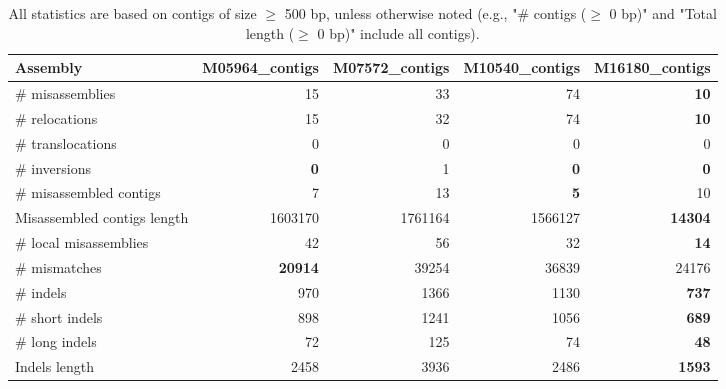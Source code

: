 \documentclass[12pt,a4paper]{article}
\begin{document}
\begin{table}[ht]
\begin{center}
\caption{All statistics are based on contigs of size $\geq$ 500 bp, unless otherwise noted (e.g., "\# contigs ($\geq$ 0 bp)" and "Total length ($\geq$ 0 bp)" include all contigs).}
\begin{tabular}{|l*{4}{|r}|}
\hline
Assembly & M05964\_contigs & M07572\_contigs & M10540\_contigs & M16180\_contigs \\ \hline
\# misassemblies & 15 & 33 & 74 & {\bf 10} \\ \hline
\hspace{5mm}\# relocations & 15 & 32 & 74 & {\bf 10} \\ \hline
\hspace{5mm}\# translocations & 0 & 0 & 0 & 0 \\ \hline
\hspace{5mm}\# inversions & {\bf 0} & 1 & {\bf 0} & {\bf 0} \\ \hline
\# misassembled contigs & 7 & 13 & {\bf 5} & 10 \\ \hline
Misassembled contigs length & 1603170 & 1761164 & 1566127 & {\bf 14304} \\ \hline
\# local misassemblies & 42 & 56 & 32 & {\bf 14} \\ \hline
\# mismatches & {\bf 20914} & 39254 & 36839 & 24176 \\ \hline
\# indels & 970 & 1366 & 1130 & {\bf 737} \\ \hline
\hspace{5mm}\# short indels & 898 & 1241 & 1056 & {\bf 689} \\ \hline
\hspace{5mm}\# long indels & 72 & 125 & 74 & {\bf 48} \\ \hline
Indels length & 2458 & 3936 & 2486 & {\bf 1593} \\ \hline
\end{tabular}
\end{center}
\end{table}
\end{document}
